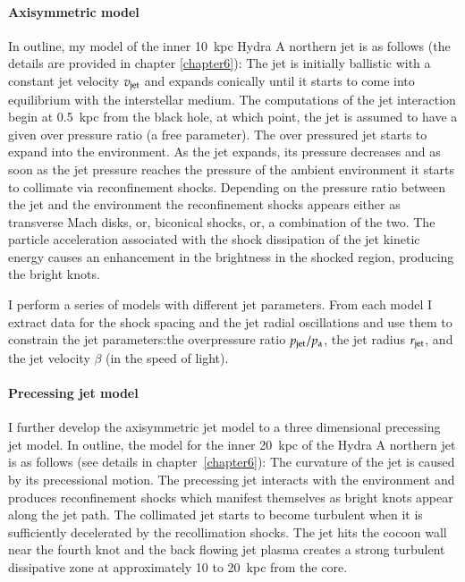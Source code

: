 \paragraph{Axisymmetric model}
 In outline, my model of the inner 10~kpc Hydra A northern jet is as follows (the details are provided in chapter \ref{chapter6}): The jet is initially ballistic with a constant jet velocity $v_{\rm jet}$ and expands conically until it starts to come into equilibrium with the interstellar medium. The computations of the jet interaction begin at 0.5~kpc from the black hole, at which point, the jet is assumed to have a given over pressure ratio (a free parameter). The over pressured jet starts to expand into the environment. As the jet expands, its pressure decreases and as soon as the jet pressure reaches the pressure of the ambient environment it starts to collimate via reconfinement shocks. Depending on the pressure ratio between the jet and the environment the reconfinement shocks appears either as transverse Mach disks, or, biconical shocks, or, a combination of the two. The particle acceleration associated with the shock dissipation of the jet kinetic energy causes an enhancement in the brightness in the shocked region, producing the bright knots. 
 
I perform a series of models with different jet parameters. From each model I extract data for the shock spacing and the jet radial oscillations  and use them to constrain the jet parameters:{the overpressure ratio $p_{\rm jet}/p_{\rm a}$, the jet radius $r_{\rm jet}$, and the jet velocity $\beta$ (in the speed of light)}.

\paragraph{Precessing jet model}
I further develop the axisymmetric jet model to a three dimensional precessing jet model. In outline, the model for the inner 20~kpc of the Hydra A northern jet is as follows (see details in chapter~\ref{chapter6}): The curvature of the jet is caused by its precessional motion. The precessing jet interacts with the environment and produces reconfinement shocks which manifest themselves as bright knots appear along the jet path. The collimated jet starts to become turbulent when it is sufficiently decelerated by the recollimation shocks. The jet hits the cocoon wall near the fourth knot and the back flowing jet plasma creates a strong turbulent dissipative zone at approximately 10 to 20~kpc from the core. 

